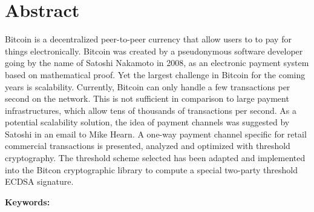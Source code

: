 \chapter*{Abstract}

Bitcoin is a decentralized peer-to-peer currency that allow users to to pay for
things electronically. Bitcoin was created by a pseudonymous software developer
going by the name of Satoshi Nakamoto in 2008, as an electronic payment system
based on mathematical proof. Yet the largest challenge in Bitcoin for the coming
years is scalability. Currently, Bitcoin can only handle a few transactions per
second on the network. This is not sufficient in comparison to large payment
infrastructures, which allow tens of thousands of transactions per second. As a
potential scalability solution, the idea of payment channels was suggested by
Satoshi in an email to Mike Hearn. A one-way payment channel specific for retail
commercial transactions is presented, analyzed and optimized with threshold
cryptography. The threshold scheme selected has been adapted and implemented
into the Bitcon cryptographic library to compute a special two-party threshold
ECDSA signature.

\vskip0.5cm
\noindent\textbf{Keywords:}
\Keywords

